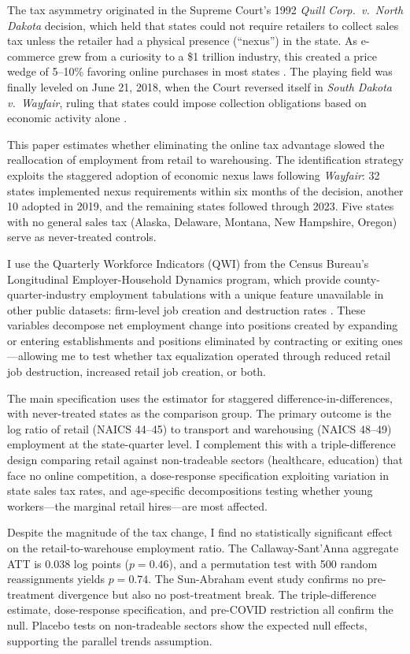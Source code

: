 \documentclass[12pt]{article}
\begin{document}
The tax asymmetry originated in the Supreme Court's 1992 \textit{Quill Corp.\ v.\ North Dakota} decision, which held that states could not require retailers to collect sales tax unless the retailer had a physical presence (``nexus'') in the state. As e-commerce grew from a curiosity to a \$1 trillion industry, this created a price wedge of 5--10\% favoring online purchases in most states \citep{einav2014,ellison2018}. The playing field was finally leveled on June 21, 2018, when the Court reversed itself in \textit{South Dakota v.\ Wayfair}, ruling that states could impose collection obligations based on economic activity alone \citep{wayfair2018}.

This paper estimates whether eliminating the online tax advantage slowed the reallocation of employment from retail to warehousing. The identification strategy exploits the staggered adoption of economic nexus laws following \textit{Wayfair}: 32 states implemented nexus requirements within six months of the decision, another 10 adopted in 2019, and the remaining states followed through 2023. Five states with no general sales tax (Alaska, Delaware, Montana, New Hampshire, Oregon) serve as never-treated controls.

I use the Quarterly Workforce Indicators (QWI) from the Census Bureau's Longitudinal Employer-Household Dynamics program, which provide county-quarter-industry employment tabulations with a unique feature unavailable in other public datasets: firm-level job creation and destruction rates \citep{abowd2009}. These variables decompose net employment change into positions created by expanding or entering establishments and positions eliminated by contracting or exiting ones---allowing me to test whether tax equalization operated through reduced retail job destruction, increased retail job creation, or both.

The main specification uses the \citet{callaway2021} estimator for staggered difference-in-differences, with never-treated states as the comparison group. The primary outcome is the log ratio of retail (NAICS 44--45) to transport and warehousing (NAICS 48--49) employment at the state-quarter level. I complement this with a triple-difference design comparing retail against non-tradeable sectors (healthcare, education) that face no online competition, a dose-response specification exploiting variation in state sales tax rates, and age-specific decompositions testing whether young workers---the marginal retail hires---are most affected.

Despite the magnitude of the tax change, I find no statistically significant effect on the retail-to-warehouse employment ratio. The Callaway-Sant'Anna aggregate ATT is 0.038 log points ($p = 0.46$), and a permutation test with 500 random reassignments yields $p = 0.74$. The Sun-Abraham event study confirms no pre-treatment divergence but also no post-treatment break. The triple-difference estimate, dose-response specification, and pre-COVID restriction all confirm the null. Placebo tests on non-tradeable sectors show the expected null effects, supporting the parallel trends assumption.
\end{document}
